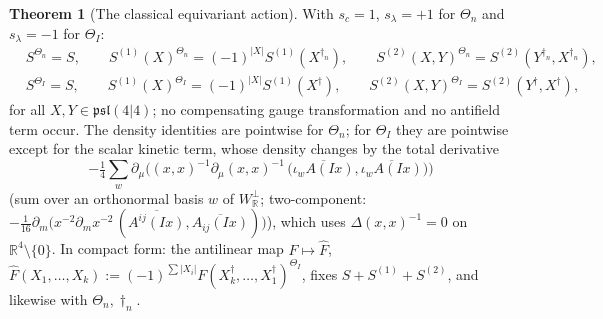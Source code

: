 \documentclass[11pt]{article}
\theoremstyle{definition}
\newtheorem{theorem}[definition]{Theorem}
\begin{document}
\begin{theorem}[The classical equivariant action]
\label{thm:fields}
With $s_c=1$, $s_\lambda=+1$ for $\Theta_n$ and $s_\lambda=-1$ for $\Theta_I$:
\[
\begin{aligned}
&S^{\Theta_n}=S,\qquad S^{(1)}(X)^{\Theta_n}=(-1)^{|X|}S^{(1)}(X^{\dagger_n}),\qquad S^{(2)}(X,Y)^{\Theta_n}=S^{(2)}(Y^{\dagger_n},X^{\dagger_n}),\\
&S^{\Theta_I}=S,\qquad S^{(1)}(X)^{\Theta_I}=(-1)^{|X|}S^{(1)}(X^{\dagger}),\qquad S^{(2)}(X,Y)^{\Theta_I}=S^{(2)}(Y^{\dagger},X^{\dagger}),
\end{aligned}
\]
for all $X,Y\in\mathfrak{psl}(4|4)$; no compensating gauge transformation and no antifield term occur. The density identities are pointwise for $\Theta_n$; for $\Theta_I$ they are pointwise except for the scalar kinetic term, whose density changes by the total derivative
\[
-\tfrac14\sum_{w}\partial_\mu\Big((x,x)^{-1}\partial_\mu(x,x)^{-1}\,\big(\overline{\iota_wA(Ix)},\overline{\iota_wA(Ix)}\big)\Big)
\]
(sum over an orthonormal basis $w$ of $W_{\mathbb R}^\perp$; two-component: $-\frac1{16}\partial_m\big(x^{-2}\partial_mx^{-2}\,(\overline{A^{ij}(Ix)},\overline{A_{ij}(Ix)})\big)$), which uses $\Delta(x,x)^{-1}=0$ on $\mathbb R^4\setminus\{0\}$. In compact form: the antilinear map $F\mapsto\widehat F$, $\widehat F(X_1,\dots,X_k):=(-1)^{\sum|X_i|}F(X_k^\dagger,\dots,X_1^\dagger)^{\Theta_I}$, fixes $S+S^{(1)}+S^{(2)}$, and likewise with $\Theta_n,\dagger_n$.
\end{theorem}
\end{document}
